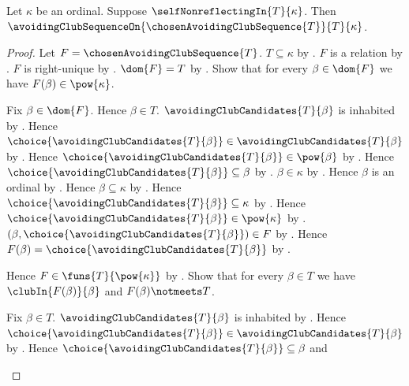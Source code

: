 \begin{theorem}\label{chosen_avoiding_club_sequence_on}
    Let $\kappa$ be an ordinal.
    Suppose $\selfNonreflectingIn{T}{\kappa}$.
    Then $\avoidingClubSequenceOn{\chosenAvoidingClubSequence{T}}{T}{\kappa}$.
\end{theorem}
\begin{proof}
    Let $F=\chosenAvoidingClubSequence{T}$.
    $T\subseteq\kappa$ by .
    $F$ is a relation by .
    $F$ is right-unique
        by .
    $\dom{F}=T$
        by .
    Show that for every $\beta\in\dom{F}$ we have $F(\beta)\in\pow{\kappa}$.
    \begin{subproof}
        Fix $\beta\in\dom{F}$.
        Hence $\beta\in T$.
        $\avoidingClubCandidates{T}{\beta}$ is inhabited
            by .
        Hence $\choice{\avoidingClubCandidates{T}{\beta}}
            \in\avoidingClubCandidates{T}{\beta}$ by .
        Hence $\choice{\avoidingClubCandidates{T}{\beta}}\in\pow{\beta}$
            by .
        Hence $\choice{\avoidingClubCandidates{T}{\beta}}\subseteq\beta$
            by .
        $\beta\in\kappa$ by .
        Hence $\beta$ is an ordinal by .
        Hence $\beta\subseteq\kappa$ by .
        Hence $\choice{\avoidingClubCandidates{T}{\beta}}\subseteq\kappa$
            by .
        Hence $\choice{\avoidingClubCandidates{T}{\beta}}\in\pow{\kappa}$
            by .
        $(\beta,\choice{\avoidingClubCandidates{T}{\beta}})\in F$
            by .
        Hence $F(\beta)=\choice{\avoidingClubCandidates{T}{\beta}}$
            by .
    \end{subproof}
    Hence $F\in\funs{T}{\pow{\kappa}}$ by .
    Show that for every $\beta\in T$ we have
        $\clubIn{F(\beta)}{\beta}$ and $F(\beta)\notmeets T$.
    \begin{subproof}
        Fix $\beta\in T$.
        $\avoidingClubCandidates{T}{\beta}$ is inhabited
            by .
        Hence $\choice{\avoidingClubCandidates{T}{\beta}}
            \in\avoidingClubCandidates{T}{\beta}$ by .
        Hence $\choice{\avoidingClubCandidates{T}{\beta}}\subseteq\beta$ and

\end{subproof}
\end{proof}
